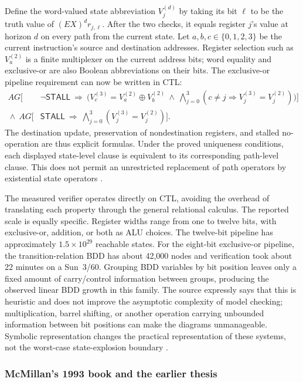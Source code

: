 Define the word-valued state abbreviation \(V_j^{(d)}\) by taking
its bit \(\ell\) to be the truth value of \((EX)^d r_{j,\ell}\).
After the two checks, it equals register \(j\)'s value at horizon
\(d\) on every path from the current state. Let \(a,b,c\in
\{0,1,2,3\}\) be the current instruction's source and destination
addresses. Register selection such as \(V_a^{(2)}\) is a finite
multiplexer on the current address bits; word equality and
exclusive-or are also Boolean abbreviations on their bits.
The exclusive-or pipeline requirement can now be written in CTL:
\[
\begin{split}
 AG\biggl[&
  \neg\mathsf{STALL}\ \Rightarrow\
   \biggl(V_c^{(3)}=V_a^{(2)}\mathbin{\oplus}V_b^{(2)}
    \ \land\
    \bigwedge_{j=0}^{3}
       (c\ne j\Rightarrow V_j^{(3)}=V_j^{(2)})\biggr)
 \biggr]\\
 {}\land\ AG\biggl[&
  \mathsf{STALL}\ \Rightarrow\
     \bigwedge_{j=0}^{3}(V_j^{(3)}=V_j^{(2)})
 \biggr].
\end{split}
\]
The destination update, preservation of nondestination registers,
and stalled no-operation are thus explicit formulas. Under the
proved uniqueness conditions, each displayed state-level clause
is equivalent to its corresponding path-level clause. This does
not permit an unrestricted replacement of path operators by
existential state operators
\cite[\S10, pp.~164--166]{BurchEtAl1992}.

The measured verifier operates directly on CTL, avoiding the overhead
of translating each property through the general relational calculus.
The reported scale is equally specific. Register widths range from one to
twelve bits, with exclusive-or, addition, or both as ALU choices.  The
twelve-bit pipeline has approximately \(1.5\times10^{29}\) reachable states.
For the eight-bit exclusive-or pipeline, the transition-relation BDD has about
42,000 nodes and verification took about 22 minutes on a Sun~3/60.  Grouping
BDD variables by bit position leaves only a fixed amount of carry/control
information between groups, producing the observed linear BDD growth in this
family.  The source expressly says that this is heuristic and does not improve
the asymptotic complexity of model checking; multiplication, barrel shifting,
or another operation carrying unbounded information between bit positions can
make the diagrams unmanageable.  Symbolic representation changes the practical
representation of these systems, not the worst-case state-explosion boundary
\cite[\S\S10--11]{BurchEtAl1992}.

\subsubsection{McMillan's 1993 book and the earlier thesis}
\label{sec:p09-n-c-017-mcmillan}

